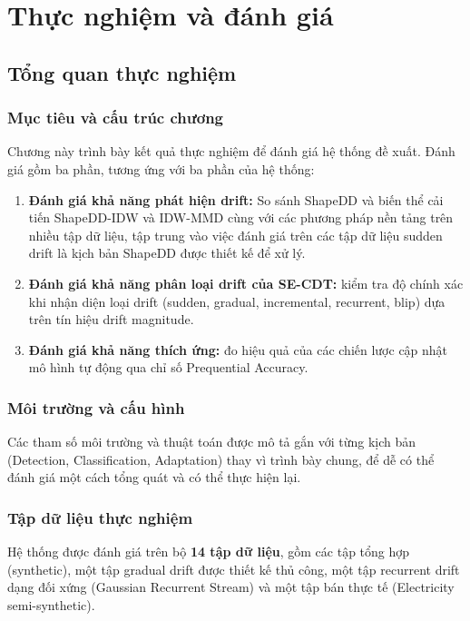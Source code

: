 \chapter{Thực nghiệm và đánh giá}
\label{chap:experiments}

\section{Tổng quan thực nghiệm}
\label{sec:overview}

\subsection{Mục tiêu và cấu trúc chương}
Chương này trình bày kết quả thực nghiệm để đánh giá hệ thống đề xuất. Đánh giá gồm ba phần, tương ứng với ba phần của hệ thống:
\begin{enumerate}
	\item \textbf{Đánh giá khả năng phát hiện drift:} So sánh ShapeDD và biến thể cải tiến ShapeDD-IDW và IDW-MMD cùng với các phương pháp nền tảng trên nhiều tập dữ liệu, tập trung vào việc đánh giá trên các tập dữ liệu sudden drift là kịch bản ShapeDD được thiết kế để xử lý.
	\item \textbf{Đánh giá khả năng phân loại drift của SE-CDT:} kiểm tra độ chính xác khi nhận diện loại drift (sudden, gradual, incremental, recurrent, blip) dựa trên tín hiệu drift magnitude.
	\item \textbf{Đánh giá khả năng thích ứng:} đo hiệu quả của các chiến lược cập nhật mô hình tự động qua chỉ số Prequential Accuracy.
\end{enumerate}

\subsection{Môi trường và cấu hình}
\label{sec:dataset-config}
Các tham số môi trường và thuật toán được mô tả gắn với từng kịch bản (Detection, Classification, Adaptation) thay vì trình bày chung, để dễ có thể đánh giá một cách tổng quát và có thể thực hiện lại.

\subsection{Tập dữ liệu thực nghiệm}

Hệ thống được đánh giá trên bộ \textbf{14 tập dữ liệu}, gồm các tập tổng hợp (synthetic), một tập gradual drift được thiết kế thủ công, một tập recurrent drift dạng đối xứng (Gaussian Recurrent Stream) và một tập bán thực tế (Electricity semi-synthetic).

